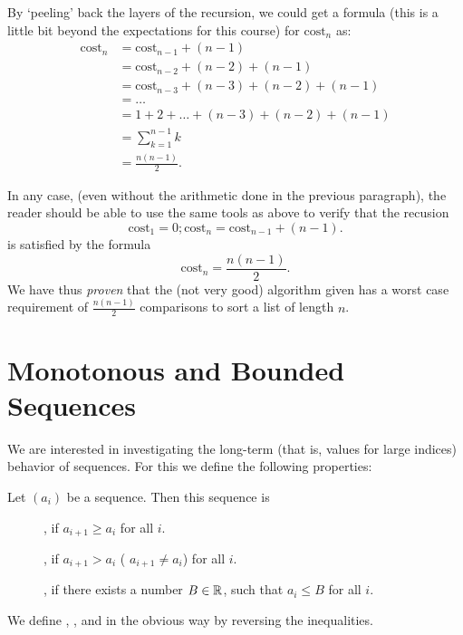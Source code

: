 By `peeling' back the layers of the recursion, we could get a formula (this
is a little bit beyond the expectations for this course) for
$\text{cost}_n$ as:
\begin{align*}
\text{cost}_n &=  \text{cost}_{n-1} + (n-1) \\
&=  \text{cost}_{n-2} +(n-2) + (n-1) \\
& =  \text{cost}_{n-3} + (n-3) +(n-2)+(n-1) \\
&=\ldots \\
&= 1 + 2 + \ldots + (n-3) + (n-2) + (n-1) \\
&= \sum_{k=1}^{n-1} k \\
&= \frac{n(n-1)}{2}.
\end{align*}

In any case, (even without the arithmetic done in the previous paragraph),
the reader should be able to use the same tools as above to verify that the
recusion
\[
\text{cost}_1=0; \text{cost}_n = \text{cost}_{n-1} + (n-1).
\]
is satisfied by the formula
\[
\text{cost}_n = \frac{n(n-1)}{2}.
\]
We have thus {\em proven} that the (not very good) algorithm given has a worst
case requirement of $\frac{n(n-1)}{2}$ comparisons to sort a list of length
$n$.


\section{Monotonous and Bounded Sequences}

We are interested in investigating the long-term (that is, values for large indices)
behavior of sequences. For this we define the following properties:
\begin{defn}
Let $(a_i)$ be a sequence. Then this sequence is
\begin{description}
\item[], if $a_{i+1}\ge a_i$ for all $i$.
\item[], if $a_{i+1}> a_i$ 
( $a_{i+1}\not=a_i$) for all $i$.
\item[], if there exists a number $B\in{\mathbb R}$, such that $a_i\le B$ for all $i$.
\end{description}
We define , ,
and  in the obvious way by reversing the inequalities.
\end{defn}

